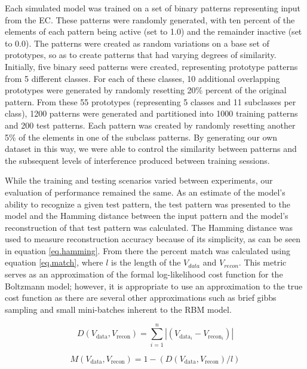 Each simulated model was trained on a set of binary patterns 
representing input from the \ac{EC}. 
These patterns were randomly generated, with ten percent  
of the elements of each pattern being active (set to 1.0) and the remainder
inactive (set to 0.0).  
The patterns were created as random variations on a base
set of prototypes, so as to create patterns that had varying degrees of
similarity. Initially, five binary seed patterns were created, representing
prototype patterns from 5 different classes.
For each of these classes, 10 additional overlapping prototypes were generated
by randomly resetting 20\% percent of the  
original pattern. 
From these 55 prototypes (representing 5 classes and 11 subclasses per class), 
1200 patterns were generated and partitioned into 1000 training patterns and 200 test patterns.
Each pattern was created by 
randomly resetting another 5\% of the elements in one of the 
subclass patterns.
By generating our own dataset in this way, we were able to control the similarity between patterns 
and the subsequent levels of interference produced between training sessions.

While the training and testing scenarios varied between experiments, our evaluation of performance remained 
the same. 
As an estimate of the model's ability to recognize a given test pattern, the
test pattern was presented to the model and the Hamming distance
between the input pattern and the model's reconstruction of that test pattern was calculated.
The Hamming distance was used to measure reconstruction accuracy because of its simplicity, 
as can be seen in equation \ref{eq.hamming}. 
From there the percent match was calculated using 
equation \ref{eq.match}, where $l$ is the length of the $V_{data}$ and $V_{recon}$. 
This metric serves as an 
approximation of the formal log-likelihood cost function for the Boltzmann model; however, 
it is appropriate to use an approximation to the true cost function as there are several 
other approximations such as brief gibbs sampling and small mini-batches inherent to the \ac{RBM} model. 

\begin{equation}
D(V_{\mathrm{data}}, V_{\mathrm{recon}}) = \sum_{i=1}^{n} |(V_{\mathrm{data}_{i}} - V_{\mathrm{recon}_{i}})| \label{eq.hamming}
\end{equation}

\begin{equation}
M(V_{\mathrm{data}}, V_{\mathrm{recon}}) = 1 - ( D(V_{\mathrm{data}}, V_{\mathrm{recon}}) / l  ) \label{eq.match}
\end{equation}

